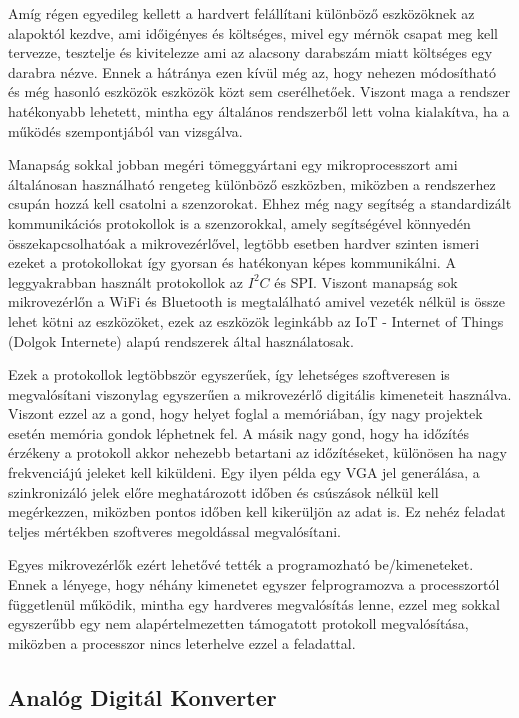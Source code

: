 Amíg régen egyedileg kellett a hardvert felállítani különböző eszközöknek az 
alapoktól kezdve, ami időigényes és költséges, mivel egy mérnök csapat meg kell 
tervezze, tesztelje és kivitelezze ami az alacsony darabszám miatt költséges egy 
darabra nézve. Ennek a hátránya ezen kívül még az, hogy nehezen módosítható és még 
hasonló eszközök eszközök közt sem cserélhetőek. Viszont maga a rendszer hatékonyabb
lehetett, mintha egy általános rendszerből lett volna kialakítva, ha a működés 
szempontjából van vizsgálva.

Manapság sokkal jobban megéri tömeggyártani egy mikroprocesszort ami általánosan 
használható rengeteg különböző eszközben, miközben a rendszerhez csupán hozzá kell 
csatolni a szenzorokat. Ehhez még nagy segítség a standardizált kommunikációs 
protokollok is a szenzorokkal, amely segítségével könnyedén összekapcsolhatóak 
a mikrovezérlővel, legtöbb esetben hardver szinten ismeri ezeket a protokollokat 
így gyorsan és hatékonyan képes kommunikálni. A leggyakrabban használt protokollok 
az $I^2C$ és SPI. Viszont manapság sok mikrovezérlőn a WiFi és Bluetooth is 
megtalálható amivel vezeték nélkül is össze lehet kötni az eszközöket, ezek az 
eszközök leginkább az IoT - Internet of Things (Dolgok Internete) alapú rendszerek
által használatosak.

Ezek a protokollok legtöbbször egyszerűek, így lehetséges szoftveresen is 
megvalósítani viszonylag egyszerűen a mikrovezérlő digitális kimeneteit használva. 
Viszont ezzel az a gond, hogy helyet foglal a memóriában, így nagy projektek esetén 
memória gondok léphetnek fel. A másik nagy gond, hogy ha időzítés érzékeny a 
protokoll akkor nehezebb betartani az időzítéseket, különösen ha nagy frekvenciájú 
jeleket kell kiküldeni. Egy ilyen példa egy VGA jel generálása, a szinkronizáló 
jelek előre meghatározott időben és csúszások nélkül kell megérkezzen, miközben 
pontos időben kell kikerüljön az adat is. Ez nehéz feladat teljes mértékben 
szoftveres megoldással megvalósítani.

Egyes mikrovezérlők ezért lehetővé tették a programozható be/kimeneteket. Ennek 
a lényege, hogy néhány kimenetet egyszer felprogramozva a processzortól függetlenül 
működik, mintha egy hardveres megvalósítás lenne, ezzel meg sokkal egyszerűbb egy 
nem alapértelmezetten támogatott protokoll megvalósítása, miközben a processzor 
nincs leterhelve ezzel a feladattal.

\subsection{Analóg Digitál Konverter}

